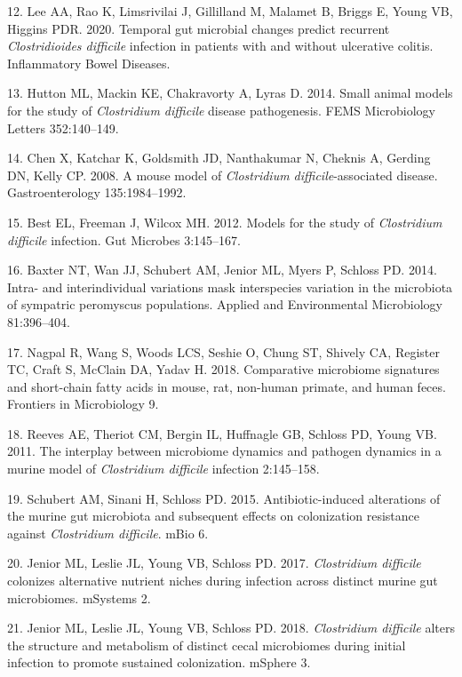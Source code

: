 \documentclass[11pt,]{article}
\begin{document}
\hypertarget{ref-Lee2020}{}
12. Lee AA, Rao K, Limsrivilai J, Gillilland M, Malamet B, Briggs E,
Young VB, Higgins PDR. 2020. Temporal gut microbial changes predict
recurrent \emph{Clostridioides difficile} infection in patients with and
without ulcerative colitis. Inflammatory Bowel Diseases.

\hypertarget{ref-Hutton2014}{}
13. Hutton ML, Mackin KE, Chakravorty A, Lyras D. 2014. Small animal
models for the study of \emph{Clostridium difficile} disease
pathogenesis. FEMS Microbiology Letters 352:140--149.

\hypertarget{ref-Chen2008}{}
14. Chen X, Katchar K, Goldsmith JD, Nanthakumar N, Cheknis A, Gerding
DN, Kelly CP. 2008. A mouse model of \emph{Clostridium
difficile}-associated disease. Gastroenterology 135:1984--1992.

\hypertarget{ref-Best2012}{}
15. Best EL, Freeman J, Wilcox MH. 2012. Models for the study of
\emph{Clostridium difficile} infection. Gut Microbes 3:145--167.

\hypertarget{ref-Baxter2014}{}
16. Baxter NT, Wan JJ, Schubert AM, Jenior ML, Myers P, Schloss PD.
2014. Intra- and interindividual variations mask interspecies variation
in the microbiota of sympatric peromyscus populations. Applied and
Environmental Microbiology 81:396--404.

\hypertarget{ref-Nagpal2018}{}
17. Nagpal R, Wang S, Woods LCS, Seshie O, Chung ST, Shively CA,
Register TC, Craft S, McClain DA, Yadav H. 2018. Comparative microbiome
signatures and short-chain fatty acids in mouse, rat, non-human primate,
and human feces. Frontiers in Microbiology 9.

\hypertarget{ref-Reeves2011}{}
18. Reeves AE, Theriot CM, Bergin IL, Huffnagle GB, Schloss PD, Young
VB. 2011. The interplay between microbiome dynamics and pathogen
dynamics in a murine model of \emph{Clostridium difficile} infection
2:145--158.

\hypertarget{ref-Schubert2015}{}
19. Schubert AM, Sinani H, Schloss PD. 2015. Antibiotic-induced
alterations of the murine gut microbiota and subsequent effects on
colonization resistance against \emph{Clostridium difficile}. mBio 6.

\hypertarget{ref-Jenior2017}{}
20. Jenior ML, Leslie JL, Young VB, Schloss PD. 2017. \emph{Clostridium
difficile} colonizes alternative nutrient niches during infection across
distinct murine gut microbiomes. mSystems 2.

\hypertarget{ref-Jenior2018}{}
21. Jenior ML, Leslie JL, Young VB, Schloss PD. 2018. \emph{Clostridium
difficile} alters the structure and metabolism of distinct cecal
microbiomes during initial infection to promote sustained colonization.
mSphere 3.
\end{document}
